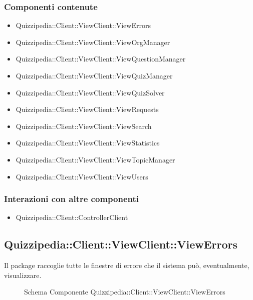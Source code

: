 \subsubsection{Componenti contenute}
\begin{itemize}
\item Quizzipedia::Client::ViewClient::ViewErrors
\item Quizzipedia::Client::ViewClient::ViewOrgManager
\item Quizzipedia::Client::ViewClient::ViewQuestionManager
\item Quizzipedia::Client::ViewClient::ViewQuizManager
\item Quizzipedia::Client::ViewClient::ViewQuizSolver
\item Quizzipedia::Client::ViewClient::ViewRequests
\item Quizzipedia::Client::ViewClient::ViewSearch
\item Quizzipedia::Client::ViewClient::ViewStatistics
\item Quizzipedia::Client::ViewClient::ViewTopicManager
\item Quizzipedia::Client::ViewClient::ViewUsers
\end{itemize}
\subsubsection{Interazioni con altre componenti}
\begin{itemize}
\item Quizzipedia::Client::ControllerClient
\end{itemize}
\subsection{Quizzipedia::Client::ViewClient::ViewErrors}
Il package raccoglie tutte le finestre di errore che il sistema può, eventualmente, visualizzare.
\begin{figure}[H]
\centering
\noindent{}
\caption[Schema Componente Quizzipedia::Client::ViewClient::ViewErrors]{Schema Componente Quizzipedia::Client::ViewClient::ViewErrors}
\end{figure}
